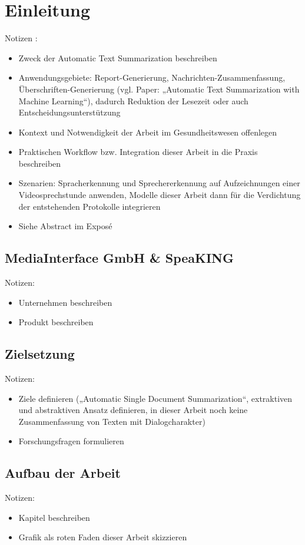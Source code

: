 \chapter{Einleitung}
\thispagestyle{fancy}
\label{chap:Einleitung}

Notizen \cite{BAC15}:
\begin{itemize}
	\item Zweck der Automatic Text Summarization beschreiben
	\item Anwendungsgebiete: Report-Generierung, Nachrichten-Zusammenfassung, Überschriften-Generierung (vgl. Paper: „Automatic Text Summarization with Machine Learning“), dadurch Reduktion der Lesezeit oder auch Entscheidungsunterstützung
	\item Kontext und Notwendigkeit der Arbeit im Gesundheitswesen offenlegen
	\item Praktischen Workflow bzw. Integration dieser Arbeit in die Praxis beschreiben
	\item Szenarien: Spracherkennung und Sprechererkennung auf Aufzeichnungen einer Videosprechstunde anwenden, Modelle dieser Arbeit dann für die Verdichtung der entstehenden Protokolle integrieren
	\item Siehe Abstract im Exposé
\end{itemize}


\section{MediaInterface GmbH \& SpeaKING\textsuperscript{\textregistered}}
Notizen:
\begin{itemize}
	\item Unternehmen beschreiben
	\item Produkt beschreiben
\end{itemize}


\section{Zielsetzung}
Notizen:
\begin{itemize}
	\item Ziele definieren („Automatic Single Document Summarization“, extraktiven und abstraktiven Ansatz definieren, in dieser Arbeit noch keine Zusammenfassung von Texten mit Dialogcharakter)
	\item Forschungsfragen formulieren
\end{itemize}


\section{Aufbau der Arbeit}
Notizen:
\begin{itemize}
	\item Kapitel beschreiben
	\item Grafik als roten Faden dieser Arbeit skizzieren
\end{itemize}



